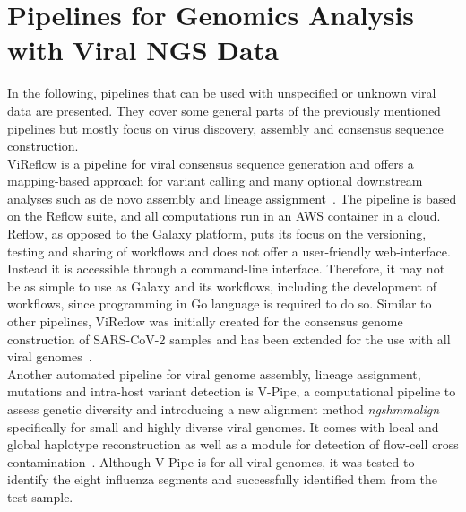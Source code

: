 \section{Pipelines for Genomics Analysis with Viral NGS Data}
In the following, pipelines that can be used with unspecified or unknown viral data are presented. They cover some general parts of the previously mentioned pipelines but mostly focus on virus discovery, assembly and consensus sequence construction. \\
ViReflow is a pipeline for viral consensus sequence generation and offers a mapping-based approach for variant calling and many optional downstream analyses such as de novo assembly and lineage assignment~\cite{moshiri2022vireflow}. The pipeline is based on the Reflow suite, and all computations run in an AWS container in a cloud. Reflow, as opposed to the Galaxy platform, puts its focus on the versioning, testing and sharing of workflows and does not offer a user-friendly web-interface. Instead it is accessible through a command-line interface. Therefore, it may not be as simple to use as Galaxy and its workflows, including the development of workflows, since programming in Go language is required to do so. Similar to other pipelines, ViReflow was initially created for the consensus genome construction of SARS-CoV-2 samples and has been extended for the use with all viral genomes~\cite{moshiri2022vireflow}. \\
Another automated pipeline for viral genome assembly, lineage assignment, mutations and intra-host variant detection is V-Pipe, a computational pipeline to assess genetic diversity and introducing a new alignment method \textit{ngshmmalign} specifically for small and highly diverse viral genomes. It comes with local and global haplotype reconstruction as well as a module for detection of flow-cell cross contamination~\cite{posada2021v}. Although V-Pipe is for all viral genomes, it was tested to identify the eight influenza segments and successfully identified them from the test sample. \\
